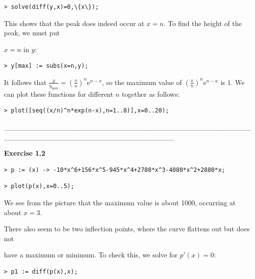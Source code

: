 \documentclass{article}
\begin{document}
\begin{lstlisting}
> solve(diff(y,x)=0,\{x\});
\end{lstlisting}
\begin{Maple Normal}
This shows that the peak does indeed occur at 
$x =n$.  To find the height of the peak, we must put
\end{Maple Normal}
\begin{Maple Normal}

$x =n$ in 
$y$:
\end{Maple Normal}
\begin{lstlisting}
> y[max] := subs(x=n,y);
\end{lstlisting}
\begin{Maple Normal}
It follows that 
$\frac{y}{y_{\max}}=(\frac{x}{n})^{n} {\mathrm e}^{n -x}$, so the maximum value of  
$(\frac{x}{n})^{n} {\mathrm e}^{n -x}$ is 
$1$.  We can plot these functions for different 
$n$ together as follows:
\end{Maple Normal}
\begin{lstlisting}
> plot([seq((x/n)^n*exp(n-x),n=1..8)],x=0..20);
\end{lstlisting}
\begin{Maple Normal}
\_\_\_\_\_\_\_\_\_\_\_\_\_\_\_\_\_\_\_\_\_\_\_\_\_\_\_\_\_\_\_\_\_\_\_\_\_\_\_\_\_\_\_\_\_\_\_\_\_\_\_\_\_\_\_\_\_\_\_\_\_\_\_\_\_\_\_\_\_\_\_\_\_\_\_\_\_\_\_\_\_
\end{Maple Normal}
\begin{Maple Heading 2}
\textbf{Exercise 1.2}
\end{Maple Heading 2}
\begin{lstlisting}
> p := (x) -> -10*x^6+156*x^5-945*x^4+2780*x^3-4080*x^2+2880*x;
\end{lstlisting}
\begin{lstlisting}
> plot(p(x),x=0..5);
\end{lstlisting}
\begin{Maple Normal}
We see from the picture that the maximum value is about 1000, occurring at about 
$x =3$. 
\end{Maple Normal}
\begin{Maple Normal}
There also seem to be two inflection points, where the curve flattens out but does not
\end{Maple Normal}
\begin{Maple Normal}
have a maximum or minimum.  To check this, we solve for 
$\mathit{p'} (x)=0$:
\end{Maple Normal}
\begin{lstlisting}
> p1 := diff(p(x),x);
\end{lstlisting}
\end{document}
